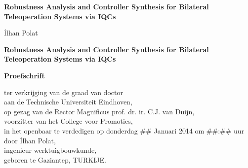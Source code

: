 \newcommand{\thetitle}{Robustness Analysis and Controller Synthesis for Bilateral\\[2mm]Teleoperation Systems via IQCs}
\newcommand{\thesubtitle}{}  
\renewcommand{\theauthor}{İlhan Polat}
\vspace*{30mm}

\thispagestyle{empty}
\begin{center}
    \textbf{\huge \thetitle}\\[\baselineskip]\textbf{\LARGE \thesubtitle}
\end{center}

\vspace{20mm}
\begin{center}
    \Large\theauthor
\end{center}
\newpage

\thispagestyle{empty}
\vspace*{\fill}{\tiny .}

\newpage
\thispagestyle{empty}
\vspace*{30mm}

\begin{center}
     \textbf{\huge \thetitle}
\end{center}

\vspace{30mm}

\begin{center}
    \textbf{Proefschrift}
\end{center}

\smallskip{}


\begin{center}
ter verkrijging van de graad van doctor\\
aan de Technische Universiteit Eindhoven,\\
op gezag van de Rector Magnificus prof. dr. ir. C.J. van Duijn,\\
voorzitter van het College voor Promoties,\\
in het openbaar te verdedigen op donderdag \#\# Januari 2014 om \#\#:\#\# uur\\
door \theauthor,\\
ingenieur werktuigbouwkunde,\\
geboren te Gaziantep, TURKIJE.
\end{center}

